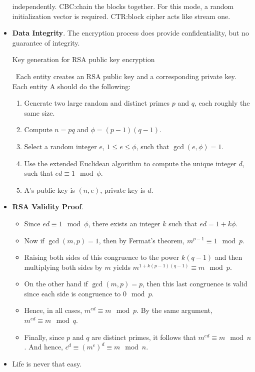 \documentclass[twocolumn]{article}
\begin{document}
\begin{itemize}
  independently. CBC:\@ chain the blocks together. For this mode, a
  random initialization vector is required. CTR:\@ block cipher acts
  like stream one.  
\item \textbf{Data Integrity}. The encryption process does provide
  confidentiality, but no guarantee of integrity. 
  \begin{algorithm}
    \begin{algorithmic}
      \caption{Key generation for RSA public key encryption}
      \label{algo:keygen-for-rsa-encrypt}
      \ENSURE~Each entity creates an RSA public key and a
      corresponding private key. Each entity A should do the
      following:
      \begin{enumerate}
      \item Generate two large random and distinct primes $p$ and $q$,
        each roughly the same size.
      \item Compute $n=pq$ and $\phi=(p-1)(q-1)$.
      \item Select a random integer $e$, $1\leq e\leq\phi$, such that
        $\gcd(e,\phi)=1$. 
      \item Use the extended Euclidean algorithm to compute the unique
        integer $d$, such that $ed\equiv 1\mod\phi$.
      \item A's public key is $(n,e)$, private key is $d$.
      \end{enumerate}
    \end{algorithmic}
  \end{algorithm}
\item \textbf{RSA Validity Proof}.
  \begin{itemize}
  \item Since $ed\equiv 1\mod\phi$, there exists an integer $k$ such
    that $ed=1+k\phi$. 
  \item Now if $\gcd(m,p)=1$, then by Fermat's theorem, $m^{p-1}\equiv
    1\mod p$. 
  \item Raising both sides of this congruence to the power $k(q-1)$
    and then multiplying both sides by $m$ yields
    $m^{1+k(p-1)(q-1)}\equiv m\mod p$.
  \item On the other hand if $\gcd(m,p)=p$, then this last congruence
    is valid since each side is congruence to $0\mod p$. 
  \item Hence, in all cases, $m^{ed}\equiv m\mod p$. By the same
    argument, $m^{ed}\equiv m\mod q$. 
  \item Finally, since $p$ and $q$ are distinct primes, it follows
    that $m^{ed}\equiv m\mod n$. And hence, $c^{d}\equiv
    {(m^{e})}^{d}\equiv m\mod n$.
  \end{itemize}
\item Life is never that easy.
\end{itemize}
\end{document}
